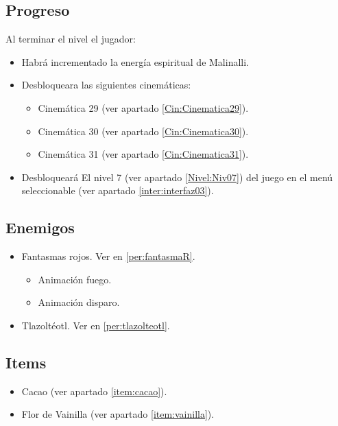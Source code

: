 	\subsection{Progreso}
	 Al terminar el nivel el jugador:
\begin{itemize}
        \item Habrá incrementado la energía espiritual de Malinalli. 
        \item Desbloqueara las siguientes cinemáticas:
\begin{itemize}
        \item Cinemática 29 (ver apartado \ref{Cin:Cinematica29}). 
        \item Cinemática 30 (ver apartado \ref{Cin:Cinematica30}).
        \item Cinemática 31 (ver apartado \ref{Cin:Cinematica31}).
\end{itemize}
        \item Desbloqueará El nivel 7 (ver apartado  \ref{Nivel:Niv07}) del juego en el menú seleccionable (ver apartado \ref{inter:interfaz03}).
\end{itemize}
	\subsection{Enemigos}
	\begin{itemize}
		\item Fantasmas rojos. Ver en \ref{per:fantasmaR}.
			\begin{itemize}
				\item Animación fuego.
				\item Animación disparo.
			\end{itemize}
		\item Tlazoltéotl. Ver en \ref{per:tlazolteotl}.
	\end{itemize}
	\subsection{Items}
\begin{itemize}
        \item   Cacao (ver apartado \ref{item:cacao}).
        \item Flor de Vainilla (ver apartado \ref{item:vainilla}).
\end{itemize}

